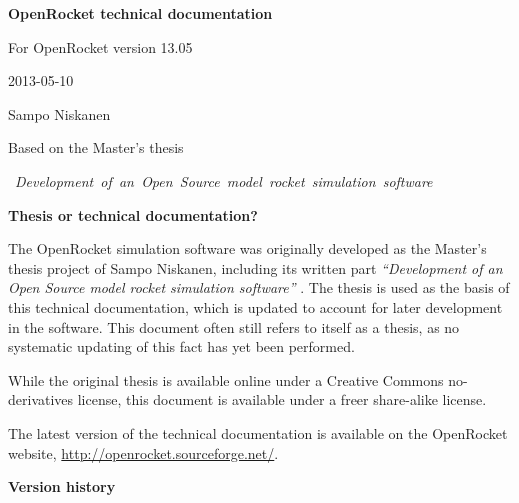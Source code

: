 \documentclass[a4paper,12pt,oneside]{book}
\begin{document}



\thispagestyle{empty}

\mbox{}
\vfill
\begin{center}
{\LARGE\bf OpenRocket technical documentation}

{\large For OpenRocket version 13.05}

\vspace{-3mm}
2013-05-10

\vspace{10mm}
{\Large Sampo Niskanen}


\vspace{80mm}
Based on the Master's thesis \cite{thesis}

\vspace{-1mm}
\mbox{\hspace{-6pt}
\large\it Development of an Open Source model rocket simulation software}

\end{center}

\vfill


\clearpage
\thispagestyle{empty}

\mbox{}
\vfill

\begin{center}
{\Large\bf Thesis or technical documentation?}
\end{center}

The OpenRocket simulation software was originally developed as the
Master's thesis project of Sampo Niskanen, including its written
part
{\it ``Development of an Open Source model rocket simulation software''}
\cite{thesis}.  The thesis is used as the basis of this technical
documentation, which is updated to account for later development in the
software.  This document often still refers to itself as a thesis, as
no systematic updating of this fact has yet been performed.

While the original thesis is available online under a Creative Commons
no-derivatives license, this document is available under a freer
share-alike license.

The latest version of the technical documentation is available on the
OpenRocket website, \url{http://openrocket.sourceforge.net/}.

\vspace{10mm}

\begin{center}
{\Large\bf Version history}
\end{center}
\end{document}
